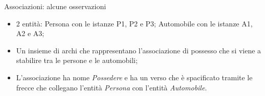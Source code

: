 \begin{frame}{Associazioni: alcune osservazioni}
\vspace{-.5cm}
\begin{center}
\end{center}
\begin{itemize}[<+->]
    \item 2 entit\`a: Persona con le istanze P1, P2 e P3; Automobile con le istanze A1, A2 e A3;
    \item Un insieme di archi che rappresentano l'associazione di possesso che si viene a stabilire tra le persone e le automobili;
    \item L'associazione ha nome \textit{Possedere} e ha un verso che \`e spacificato tramite le frecce che collegano l'entit\`a \textit{Persona} con l'entit\`a \textit{Automobile}.
\end{itemize}
\end{frame}
%
